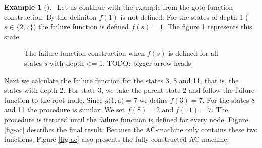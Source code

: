 \documentclass[english,twoside,censored,csm,algorithms-track-2020]{HYthesisML}
\theoremstyle{plain}
\theoremstyle{definition}
\newtheorem{example}[theorem]{Example}
\begin{document}
  \begin{example}[]~\label{exmp-fail}
  Let us continue with the example from the goto function construction. By the definiton $f(1)$ is not
  defined. For the states of depth 1 ($s\in\{2,7\}$) the failure function is defined $f(s)=1$. The
  figure \ref{fig-ac-step5} represents this state.

  \begin{figure}[h]
  \centering
  \caption{The failure function construction when $f(s)$ is defined for all states $s$ with depth <= 1. TODO: bigger arrow heads.} \label{fig-ac-step5}
\end{figure}

  Next we calculate the failure function for the states 3, 8 and 11, that is, the states with depth 2.
  For state 3, we take the parent state 2 and follow the failure function to the root node. Since
  $g(1,$a$) = 7$ we define $f(3)=7$. For the states 8 and 11 the procedure is similar. We set 
  $f(8)=2$ and $f(11)=7$. The procedure is iterated until the failure function is defined for every
  node. Figure \ref{fig-ac} describes the final result. Because the AC-machine only contains these
  two functions, Figure \ref{fig-ac} also presents the fully constructed AC-machine.


\end{example}
\end{document}
